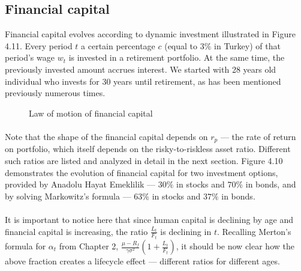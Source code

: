 \subsection{Financial capital}

Financial capital evolves according to dynamic investment illustrated in Figure 4.11. Every period $t$ a certain percentage $c$ (equal to $3\%$ in Turkey) of that period's wage $w_t$ is invested in a retirement portfolio. At the same time, the previously invested amount accrues interest. We started with 28 years old individual who invests for 30 years until retirement, as has been mentioned previously numerous times.

\begin{figure}[h]
	\centering
	\caption{Law of motion of financial capital}
\end{figure}

\paragraph{}Note that the shape of the financial capital depends on $r_p$ --- the rate of return on portfolio, which itself depends on the risky-to-riskless asset ratio. Different such ratios are listed and analyzed in detail in the next section. Figure 4.10 demonstrates the evolution of financial capital for two investment options, provided by Anadolu Hayat Emeklilik --- $30\%$ in stocks and $70\%$ in bonds, and by solving Markowitz's formula --- $63\%$ in stocks and $37\%$ in bonds.

\paragraph{}It is important to notice here that since human capital is declining by age and financial capital is increasing, the ratio $\frac{L_t}{F_t}$ is declining in $t$. Recalling Merton's formula for $\alpha_t$ from Chapter 2, $\frac{\mu - R_f}{\gamma \sigma^2}(1+\frac{L_t}{F_t})$, it should be now clear how the above fraction creates a lifecycle effect --- different ratios for different ages. 
